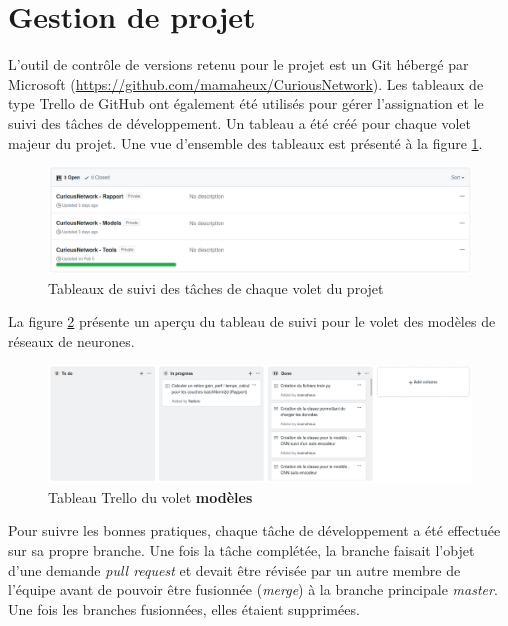\section{Gestion de projet}
    L'outil de contrôle de versions retenu pour le projet est un Git hébergé par Microsoft (\url{https://github.com/mamaheux/CuriousNetwork}). Les tableaux de type Trello de GitHub ont également été utilisés pour gérer l'assignation et le suivi des tâches de développement. Un tableau a été créé pour chaque volet majeur du projet. Une vue d'ensemble des tableaux est présenté à la figure \ref{fig:trello_boards}.

    \begin{figure}[H]
        \centering
        \includegraphics[width=15cm]{images/3_sub_projects.png}
        \caption{Tableaux de suivi des tâches de chaque volet du projet}
        \label{fig:trello_boards}
    \end{figure}

    La figure \ref{fig:trello_board_models} présente un aperçu du tableau de suivi pour le volet des modèles de réseaux de neurones.
    \begin{figure}[H]
        \centering
        \includegraphics[width=15cm]{images/trello_board.png}
        \caption[Tableau Trello du volet modèles]{Tableau Trello du volet \textbf{modèles}}
        \label{fig:trello_board_models}
    \end{figure}

    Pour suivre les bonnes pratiques, chaque tâche de développement a été effectuée sur sa propre branche. Une fois la tâche complétée, la branche faisait l'objet d'une demande \textit{pull request} et devait être révisée par un autre membre de l'équipe avant de pouvoir être fusionnée (\textit{merge}) à la branche principale \textit{master}. Une fois les branches fusionnées, elles étaient supprimées.\\
    
